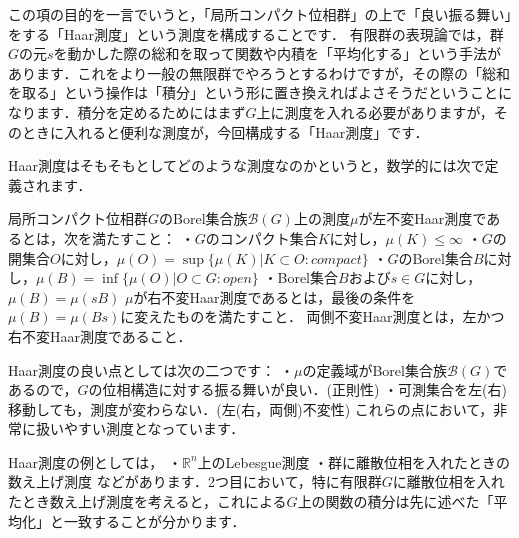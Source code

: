

この項の目的を一言でいうと，「局所コンパクト位相群」の上で「良い振る舞い」をする「Haar測度」という測度を構成することです．
有限群の表現論では，群$G$の元$s$を動かした際の総和を取って関数や内積を「平均化する」という手法があります．これをより一般の無限群でやろうとするわけですが，その際の「総和を取る」という操作は「積分」という形に置き換えればよさそうだということになります．積分を定めるためにはまず$G$上に測度を入れる必要がありますが，そのときに入れると便利な測度が，今回構成する「Haar測度」です．

Haar測度はそもそもとしてどのような測度なのかというと，数学的には次で定義されます．
\begin{defi}[Haar測度]\label{1}
局所コンパクト位相群$G$のBorel集合族$\mathscr{B}(G)$上の測度$\mu$が左不変Haar測度であるとは，次を満たすこと：
・$G$のコンパクト集合$K$に対し，$\mu(K) \le \infty$
・$G$の開集合$O$に対し，$\mu(O)=\sup \{ \mu(K) | K \subset O \colon compact \}$
・$G$のBorel集合$B$に対し，$\mu(B)=\inf \{ \mu(O) | O \subset G \colon open \}$
・Borel集合$B$および$s \in G$に対し，$\mu (B) = \mu (sB)$
$\mu$が右不変Haar測度であるとは，最後の条件を$\mu (B) = \mu (Bs)$に変えたものを満たすこと．
両側不変Haar測度とは，左かつ右不変Haar測度であること．
\end{defi}
Haar測度の良い点としては次の二つです：
・$\mu$の定義域がBorel集合族$\mathscr{B}(G)$であるので，$G$の位相構造に対する振る舞いが良い．(正則性)
・可測集合を左(右)移動しても，測度が変わらない．(左(右，両側)不変性)
これらの点において，非常に扱いやすい測度となっています．

Haar測度の例としては，
・$\mathbb{R}^n$上のLebesgue測度
・群に離散位相を入れたときの数え上げ測度
などがあります．2つ目において，特に有限群$G$に離散位相を入れたとき数え上げ測度を考えると，これによる$G$上の関数の積分は先に述べた「平均化」と一致することが分かります．

